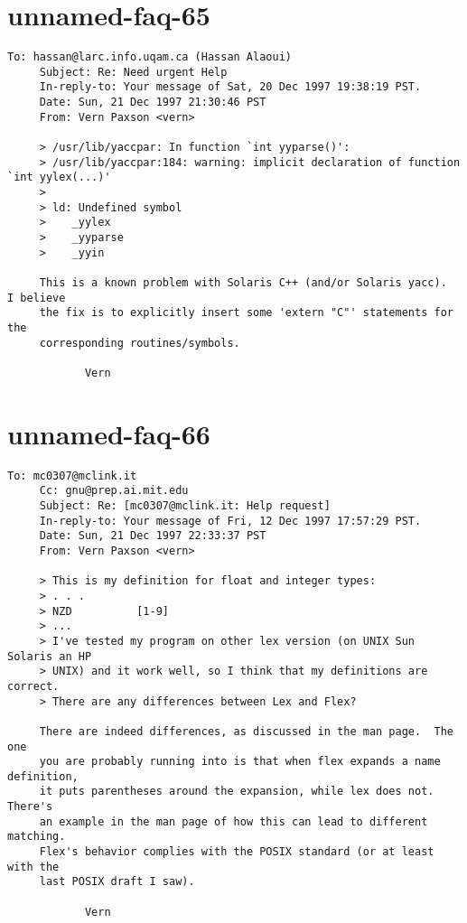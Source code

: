\documentclass[openany,oneside]{book}
\begin{document}
\section{unnamed-faq-65}

\begin{verbatim}
To: hassan@larc.info.uqam.ca (Hassan Alaoui)
     Subject: Re: Need urgent Help
     In-reply-to: Your message of Sat, 20 Dec 1997 19:38:19 PST.
     Date: Sun, 21 Dec 1997 21:30:46 PST
     From: Vern Paxson <vern>
     
     > /usr/lib/yaccpar: In function `int yyparse()':
     > /usr/lib/yaccpar:184: warning: implicit declaration of function `int yylex(...)'
     >
     > ld: Undefined symbol
     >    _yylex
     >    _yyparse
     >    _yyin
     
     This is a known problem with Solaris C++ (and/or Solaris yacc).  I believe
     the fix is to explicitly insert some 'extern "C"' statements for the
     corresponding routines/symbols.
     
     		Vern
\end{verbatim}

\section{unnamed-faq-66}

\begin{verbatim}
To: mc0307@mclink.it
     Cc: gnu@prep.ai.mit.edu
     Subject: Re: [mc0307@mclink.it: Help request]
     In-reply-to: Your message of Fri, 12 Dec 1997 17:57:29 PST.
     Date: Sun, 21 Dec 1997 22:33:37 PST
     From: Vern Paxson <vern>
     
     > This is my definition for float and integer types:
     > . . .
     > NZD          [1-9]
     > ...
     > I've tested my program on other lex version (on UNIX Sun Solaris an HP
     > UNIX) and it work well, so I think that my definitions are correct.
     > There are any differences between Lex and Flex?
     
     There are indeed differences, as discussed in the man page.  The one
     you are probably running into is that when flex expands a name definition,
     it puts parentheses around the expansion, while lex does not.  There's
     an example in the man page of how this can lead to different matching.
     Flex's behavior complies with the POSIX standard (or at least with the
     last POSIX draft I saw).
     
     		Vern
\end{verbatim}
\end{document}
